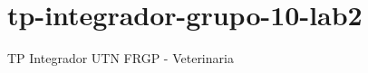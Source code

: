 \chapter{tp-\/integrador-\/grupo-\/10-\/lab2}
\hypertarget{md__f_1_2dev_projects_2_facu_2_lab_i_i_2tp-integrador-grupo-10-lab2_2_r_e_a_d_m_e}{}\label{md__f_1_2dev_projects_2_facu_2_lab_i_i_2tp-integrador-grupo-10-lab2_2_r_e_a_d_m_e}
\label{md__f_1_2dev_projects_2_facu_2_lab_i_i_2tp-integrador-grupo-10-lab2_2_r_e_a_d_m_e_autotoc_md0}%
%
TP Integrador UTN FRGP -\/ Veterinaria 